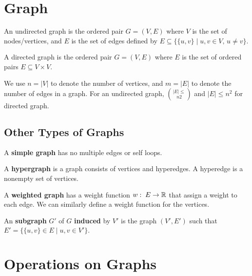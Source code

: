 \section{Graph}

\vspace{\parskip}

\begin{definition} 
    An undirected graph is the ordered pair $G=(V,E)$ where $V$ is the set of nodes/vertices, and $E$ is the set of edges defined by $E \subseteq \{ \{u,v\} \mid u,v \in V,\, u \neq v \}$.
\end{definition}

\begin{definition} 
    A directed graph is the ordered pair $G=(V,E)$ where $E$ is the set of ordered pairs $E \subseteq V \times V$.
\end{definition}

We use $n = |V|$ to denote the number of vertices, and $m = |E|$ to denote the number of edges in a graph. For an undirected graph, $|E| \leq \choose{n 2}$ and $|E| \leq n^2$ for directed graph. 

\subsection{Other Types of Graphs}   

A \textbf{simple graph} has no multiple edges or self loops.

A \textbf{hypergraph} is a graph consists of vertices and hyperedges. A hyperedge is a nonempty set of vertices.

A \textbf{weighted graph} has a weight function $w:\; E \to \mathbb{R}$ that assign a weight to each edge. We can similarly define a weight function for the vertices.

An \textbf{subgraph} $G'$ of $G$ \textbf{induced} by $V'$ is the graph $(V',E')$ such that $E' = \{ \{u,v\} \in E \mid u,v \in V' \}$. 

\section{Operations on Graphs}

